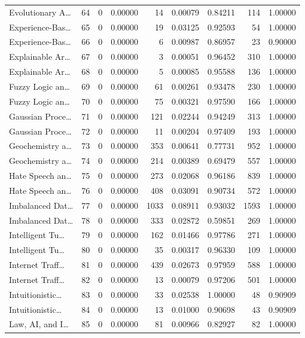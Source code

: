\begin{table}
\begin{tabular}{lrrrrrrrr}
Evolutionary A… & 64 & 0 & 0.00000 & 14 & 0.00079 & 0.84211 & 114 & 1.00000 \\
Experience-Bas… & 65 & 0 & 0.00000 & 19 & 0.03125 & 0.92593 & 54 & 1.00000 \\
Experience-Bas… & 66 & 0 & 0.00000 & 6 & 0.00987 & 0.86957 & 23 & 0.90000 \\
Explainable Ar… & 67 & 0 & 0.00000 & 3 & 0.00051 & 0.96452 & 310 & 1.00000 \\
Explainable Ar… & 68 & 0 & 0.00000 & 5 & 0.00085 & 0.95588 & 136 & 1.00000 \\
Fuzzy Logic an… & 69 & 0 & 0.00000 & 61 & 0.00261 & 0.93478 & 230 & 1.00000 \\
Fuzzy Logic an… & 70 & 0 & 0.00000 & 75 & 0.00321 & 0.97590 & 166 & 1.00000 \\
Gaussian Proce… & 71 & 0 & 0.00000 & 121 & 0.02244 & 0.94249 & 313 & 1.00000 \\
Gaussian Proce… & 72 & 0 & 0.00000 & 11 & 0.00204 & 0.97409 & 193 & 1.00000 \\
Geochemistry a… & 73 & 0 & 0.00000 & 353 & 0.00641 & 0.77731 & 952 & 1.00000 \\
Geochemistry a… & 74 & 0 & 0.00000 & 214 & 0.00389 & 0.69479 & 557 & 1.00000 \\
Hate Speech an… & 75 & 0 & 0.00000 & 273 & 0.02068 & 0.96186 & 839 & 1.00000 \\
Hate Speech an… & 76 & 0 & 0.00000 & 408 & 0.03091 & 0.90734 & 572 & 1.00000 \\
Imbalanced Dat… & 77 & 0 & 0.00000 & 1033 & 0.08911 & 0.93032 & 1593 & 1.00000 \\
Imbalanced Dat… & 78 & 0 & 0.00000 & 333 & 0.02872 & 0.59851 & 269 & 1.00000 \\
Intelligent Tu… & 79 & 0 & 0.00000 & 162 & 0.01466 & 0.97786 & 271 & 1.00000 \\
Intelligent Tu… & 80 & 0 & 0.00000 & 35 & 0.00317 & 0.96330 & 109 & 1.00000 \\
Internet Traff… & 81 & 0 & 0.00000 & 439 & 0.02673 & 0.97959 & 588 & 1.00000 \\
Internet Traff… & 82 & 0 & 0.00000 & 13 & 0.00079 & 0.97206 & 501 & 1.00000 \\
Intuitionistic… & 83 & 0 & 0.00000 & 33 & 0.02538 & 1.00000 & 48 & 0.90909 \\
Intuitionistic… & 84 & 0 & 0.00000 & 13 & 0.01000 & 0.90698 & 43 & 0.90909 \\
Law, AI, and I… & 85 & 0 & 0.00000 & 81 & 0.00966 & 0.82927 & 82 & 1.00000 \\

\end{tabular}
\end{table}
